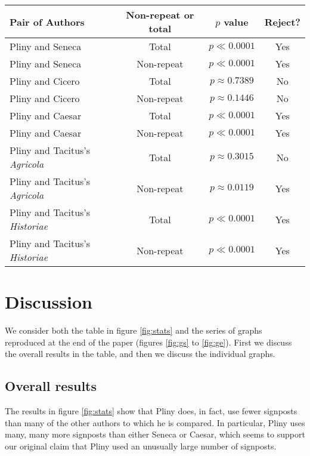 \begin{figure*}[t]
  \begin{center}
    \begin{tabular}{| l | c | c | c |}
      \hline
      Pair of Authors & Non-repeat or total & $p$ value & Reject? \\ \hline \hline
      Pliny and Seneca & Total & $p \ll 0.0001$ & Yes \\ \hline
      Pliny and Seneca & Non-repeat & $p \ll 0.0001$ & Yes \\ \hline
      Pliny and Cicero & Total & $p \approx 0.7389$ & No \\ \hline
      Pliny and Cicero & Non-repeat & $p \approx 0.1446$ & No \\ \hline
      Pliny and Caesar & Total & $p \ll 0.0001$ & Yes \\ \hline
      Pliny and Caesar & Non-repeat & $p \ll 0.0001$ & Yes \\ \hline
      Pliny and Tacitus's \textit{Agricola} & Total & $p \approx 0.3015$ & No \\ \hline
      Pliny and Tacitus's \textit{Agricola} & Non-repeat & $p \approx 0.0119$ & Yes \\ \hline
      Pliny and Tacitus's \textit{Historiae} & Total & $p \ll 0.0001$ & Yes \\ \hline
      Pliny and Tacitus's \textit{Historiae} & Non-repeat & $p \ll 0.0001$ & Yes \\      
      \hline
    \end{tabular}
  \end{center}
  \caption{\label{fig:stats}The results of the statistical analysis desrcibed in section \ref{sec:stats}.}
\end{figure*}

\section{Discussion}
\label{sec:discuss}

We consider both the table in figure \ref{fig:stats} and the series of graphs reproduced at the end of the paper (figures \ref{fig:gs} to \ref{fig:ge}). First we discuss the overall results in the table, and then we discuss the individual graphs.

\subsection{Overall results}

The results in figure \ref{fig:stats} show that Pliny does, in fact, use fewer signposts than many of the other authors to which he is compared. In particular, Pliny uses many, many more signposts than either Seneca or Caesar, which seems to support our original claim that Pliny used an unusually large number of signposts.

